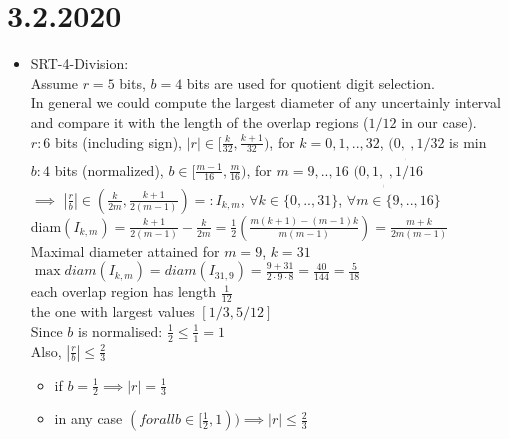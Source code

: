 \section*{3.2.2020}
\begin{itemize}
    \item SRT-4-Division: \\
    Assume $r=5$ bits, $b=4$ bits are used for quotient digit selection. \\
    In general we could compute the largest diameter of any uncertainly interval and compare it with the length of the overlap regions ($1/12$ in our case). \\
   
    $r: 6$ bits (including sign), $|r|\in [\frac{k}{32},\frac{k+1}{32})$, for $k=0,1,..,32$, $(0,_ _ _ _ _), 1/32 $ is min\\
   
    $b: 4$ bits (normalized), $b\in [\frac{m-1}{16},\frac{m}{16})$, for $m=9,..,16$ $(0,1, _ _ _ _), 1/16 $\\
   
    $\implies$ $|\frac{r}{b}|\in (\frac{k}{2m},\frac{k+1}{2(m-1)})=:I_{k,m}$, $\forall k\in\{0,..,31\}$, $\forall m\in\{9,..,16\}$ \\
   
    diam$(I_{k,m})=\frac{k+1}{2(m-1)}-\frac{k}{2m}=\frac{1}{2}(\frac{m(k+1)-(m-1)k}{m(m-1)})=\frac{m+k}{2m(m-1)}$ \\
   
    Maximal diameter attained for $m=9$, $k=31$ \\
    $\max diam(I_{k,m})=diam(I_{31,9})=\frac{9+31}{2\cdot 9\cdot 8}=\frac{40}{144}=\frac{5}{18}$ \\
   
    each overlap region has length $\frac{1}{12}$ \\
    the one with largest values $[1/3,5/12]$ \\
   
    Since $b$ is normalised: $\frac{1}{2}\le \frac{1}{1}=1$ \\
    Also, $|\frac{r}{b}|\le \frac{2}{3}$
    \begin{itemize}
        \item if $b=\frac{1}{2} \implies |r|=\frac{1}{3}$
        \item in any case $(forall b\in [\frac{1}{2},1))\implies |r|\le \frac{2}{3}$
    \end{itemize}
   

\end{itemize}
